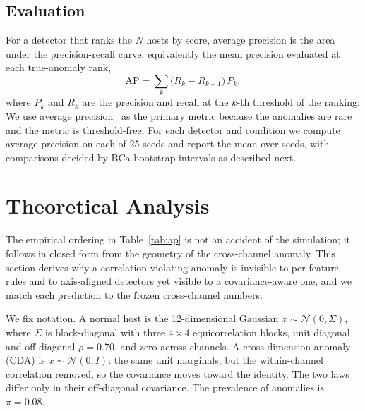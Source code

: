 \documentclass[journal]{IEEEtran}
\begin{document}
\subsection{Evaluation}
For a detector that ranks the $N$ hosts by score, average precision is the area under the
precision-recall curve, equivalently the mean precision evaluated at each true-anomaly rank,
\begin{equation}
\mathrm{AP} = \sum_{k} \big(R_k - R_{k-1}\big)\, P_k,
\end{equation}
where $P_k$ and $R_k$ are the precision and recall at the $k$-th threshold of the ranking. We use
average precision~\cite{davis2006pr} as the primary metric because the anomalies are rare and the
metric is threshold-free. For each detector and condition we compute average precision on each of 25
seeds and report the mean over seeds, with comparisons decided by BCa bootstrap intervals as
described next.

\section{Theoretical Analysis}
\label{sec:theory}
The empirical ordering in Table~\ref{tab:ap} is not an accident of the simulation; it follows in
closed form from the geometry of the cross-channel anomaly. This section derives why a
correlation-violating anomaly is invisible to per-feature rules and to axis-aligned detectors yet
visible to a covariance-aware one, and we match each prediction to the frozen cross-channel numbers.

We fix notation. A normal host is the 12-dimensional Gaussian $x \sim \mathcal{N}(0, \Sigma)$, where
$\Sigma$ is block-diagonal with three $4 \times 4$ equicorrelation blocks, unit diagonal and
off-diagonal $\rho = 0.70$, and zero across channels. A cross-dimension anomaly (CDA) is
$x \sim \mathcal{N}(0, I)$: the same unit marginals, but the within-channel correlation removed, so
the covariance moves toward the identity. The two laws differ only in their off-diagonal covariance.
The prevalence of anomalies is $\pi = 0.08$.
\end{document}
